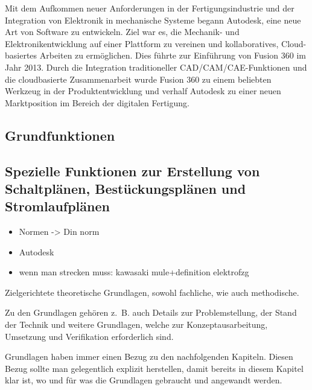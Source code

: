 Mit dem Aufkommen neuer Anforderungen in der Fertigungsindustrie und der Integration von Elektronik in mechanische Systeme begann Autodesk, eine neue Art von Software zu entwickeln. Ziel war es, die Mechanik- und Elektronikentwicklung auf einer Plattform zu vereinen und kollaboratives, Cloud-basiertes Arbeiten zu ermöglichen. Dies führte zur Einführung von Fusion 360 im Jahr 2013. 
Durch die Integration traditioneller CAD/CAM/CAE-Funktionen und die cloudbasierte Zusammenarbeit wurde Fusion 360 zu einem beliebten Werkzeug in der Produktentwicklung und verhalf Autodesk zu einer neuen Marktposition im Bereich der digitalen Fertigung.
\subsection{Grundfunktionen}
\subsection{Spezielle Funktionen zur Erstellung von Schaltplänen, Bestückungsplänen und Stromlaufplänen}

	\begin{itemize}
		\item Normen -> Din norm
		\item Autodesk
		\item wenn man strecken muss: kawasaki mule+definition elektrofzg
		\end{itemize}
Zielgerichtete theoretische Grundlagen, sowohl fachliche, wie auch methodische.

Zu den Grundlagen gehören z.~B. auch Details zur Problemstellung, der Stand der Technik und weitere Grundlagen, welche zur Konzeptausarbeitung, Umsetzung und Verifikation erforderlich sind.

Grundlagen haben immer einen Bezug zu den nachfolgenden Kapiteln. Diesen Bezug sollte man gelegentlich explizit herstellen, damit bereits in diesem Kapitel klar ist, wo und für was die Grundlagen gebraucht und angewandt werden.